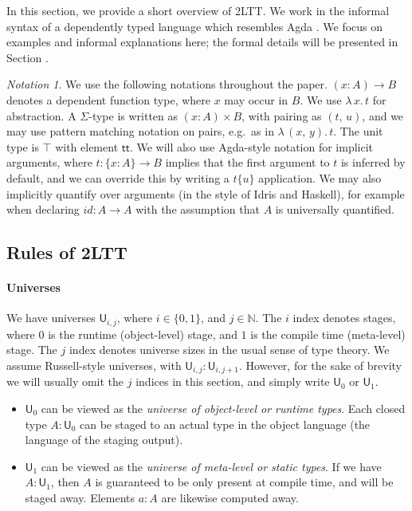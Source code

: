 \documentclass[acmsmall]{acmart}
\newcommand{\mit}[1]{\mathit{#1}}
\newcommand{\msf}[1]{\mathsf{#1}}
\newcommand{\mbb}[1]{\mathbb{#1}}
\renewcommand{\U}{\msf{U}}
\renewcommand{\tt}{\msf{tt}}
\theoremstyle{remark}
\newtheorem{notation}{Notation}
\begin{document}
In this section, we provide a short overview of 2LTT. We work in the informal
syntax of a dependently typed language which resembles Agda \cite{TODO}. We focus
on examples and informal explanations here; the formal details will be presented
in Section \cite{TODO}.

\begin{notation}
We use the following notations throughout the paper. $(x : A) \to B$ denotes a
dependent function type, where $x$ may occur in $B$. We use $\lambda\,x.\,t$ for
abstraction. A $\Sigma$-type is written as $(x : A) \times B$, with pairing as
$(t,\,u)$, and we may use pattern matching notation on pairs, e.g.\ as in
$\lambda\,(x,\,y).\,t$. The unit type is $\top$ with element $\tt$. We will also
use Agda-style notation for implicit arguments, where $t : \{x : A\} \to B$
implies that the first argument to $t$ is inferred by default, and we can
override this by writing a $t \{u\}$ application. We may also implicitly
quantify over arguments (in the style of Idris and Haskell), for example
when declaring $\mit{id} : A \to A$ with the assumption that $A$ is universally
quantified.
\end{notation}

\subsection{Rules of 2LTT}

\paragraph{Universes} We have universes $\U_{i,j}$, where $i \in \{0,1\}$, and $j \in \mbb{N}$.
The $i$ index denotes stages, where $0$ is the runtime (object-level) stage, and
$1$ is the compile time (meta-level) stage. The $j$ index denotes universe sizes
in the usual sense of type theory. We assume Russell-style universes, with
$\U_{i,j} : \U_{i, j+1}$. However, for the sake of brevity we will usually omit
the $j$ indices in this section, and simply write $\U_0$ or $\U_1$.
\begin{itemize}
\item $\U_0$ can be viewed as the \emph{universe of object-level or runtime types}.
    Each closed type $A : \U_0$ can be staged to an actual type in the object language
    (the language of the staging output).
  \item $\U_1$ can be viewed as the \emph{universe of meta-level or static types}. If we
    have $A : \U_1$, then $A$ is guaranteed to be only present at compile time,
    and will be staged away. Elements $a : A$ are likewise computed away.
\end{itemize}
\end{document}
